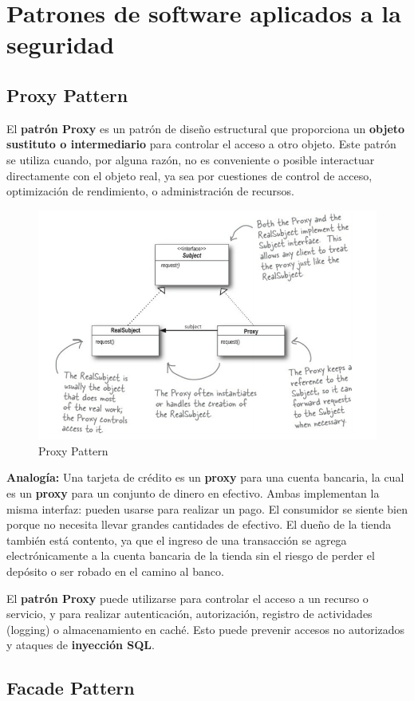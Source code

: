 \chapter{Patrones de software aplicados a la seguridad}

\section{Proxy Pattern}

El \textbf{patrón Proxy} es un patrón de diseño estructural que proporciona un \textbf{objeto sustituto o intermediario} para controlar el acceso a otro objeto. Este patrón se utiliza cuando, por alguna razón, no es conveniente o posible interactuar directamente con el objeto real, ya sea por cuestiones de control de acceso, optimización de rendimiento, o administración de recursos.

\begin{figure}[H]
    \centering
        \includegraphics[width=0.5\linewidth]{PatronesSoftware/proxypattern.png}
        \caption{Proxy Pattern}
        \label{fig:proxy-pattern}
\end{figure}

\textbf{Analogía:} Una tarjeta de crédito es un \textbf{proxy} para una cuenta bancaria, la cual es un \textbf{proxy} para un conjunto de dinero en efectivo. Ambas implementan la misma interfaz: pueden usarse para realizar un pago. El consumidor se siente bien porque no necesita llevar grandes cantidades de efectivo. El dueño de la tienda también está contento, ya que el ingreso de una transacción se agrega electrónicamente a la cuenta bancaria de la tienda sin el riesgo de perder el depósito o ser robado en el camino al banco. 

El \textbf{patrón Proxy} puede utilizarse para controlar el acceso a un recurso o servicio, y para realizar autenticación, autorización, registro de actividades (logging) o almacenamiento en caché. Esto puede prevenir accesos no autorizados y ataques de \textbf{inyección SQL}.


\section{Facade Pattern}

